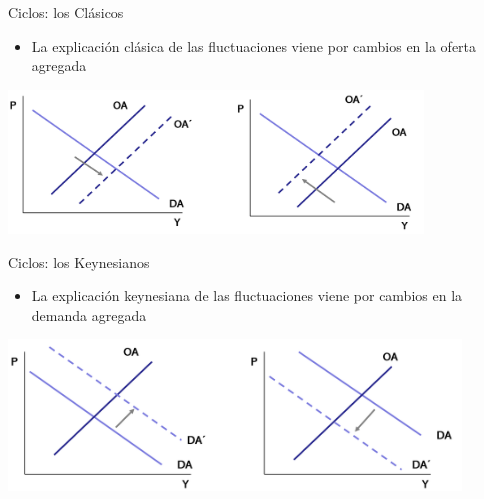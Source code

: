 \documentclass{beamer}
\begin{document}
\begin{frame}{Ciclos: los Clásicos}

\begin{itemize}
    \item La explicación clásica de las fluctuaciones viene por cambios en la oferta agregada
\end{itemize}

\vspace{2mm}

\centering\includegraphics[width=11cm]{Figures/P23.png}\

\end{frame}



\begin{frame}{ Ciclos: los Keynesianos}

\begin{itemize}
    \item La explicación keynesiana de las fluctuaciones viene por cambios en la demanda agregada
\end{itemize}

\vspace{2mm}

\centering\includegraphics[width=12cm]{Figures/P24.png}\

\end{frame}


\end{document}
